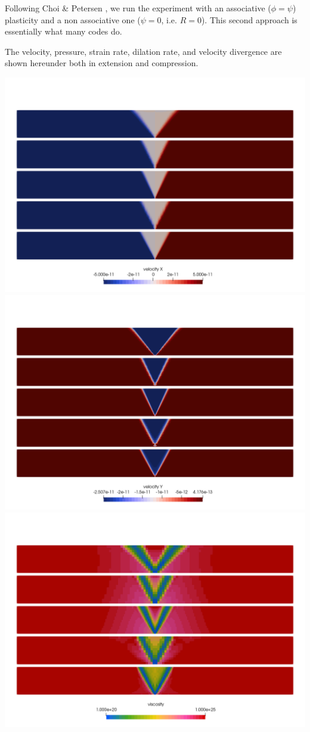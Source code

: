 Following Choi \& Petersen \cite{chpe15}, we run the experiment with an associative ($\phi=\psi$) plasticity
and a non associative one ($\psi=0$, i.e. $R=0$). This second approach is essentially what many codes 
do. 

The velocity, pressure, strain rate, dilation rate, and velocity divergence are shown hereunder both in 
extension and compression.

\begin{center}
\includegraphics[width=.8\linewidth]{python_codes/fieldstone_39/images/extension_u}\\
\includegraphics[width=.8\linewidth]{python_codes/fieldstone_39/images/extension_v}\\
\includegraphics[width=.8\linewidth]{python_codes/fieldstone_39/images/extension_mueff}\\

\end{center}
